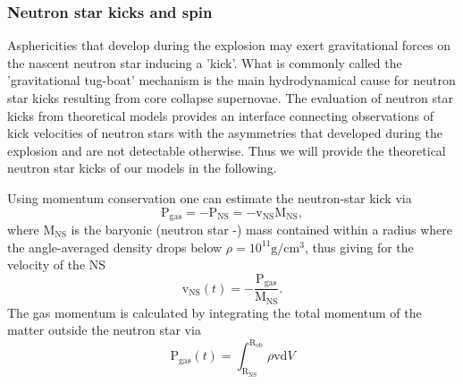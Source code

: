 \documentclass[fleqn,usenatbib]{mnras}
\newcommand{\ud}{\ensuremath{\mathrm{d}}}
\begin{document}
\subsubsection{Neutron star kicks and spin}
Asphericities that develop during the explosion may exert gravitational forces on the nascent neutron star inducing a 'kick'. What is commonly called the 'gravitational tug-boat' mechanism is the main hydrodynamical cause for neutron star kicks resulting from core collapse supernovae. The evaluation of neutron star kicks from theoretical models provides an interface connecting observations of kick velocities of neutron stars with the asymmetries that developed during the explosion and are not detectable otherwise. Thus we will provide the theoretical neutron star kicks of our models in the following.

Using momentum conservation one can estimate the neutron-star kick via
\begin{equation}
  \pmb{\mathrm{P}}_{\mathrm{gas}} = - \pmb{\mathrm{P}}_{\mathrm{NS}} = - \pmb{\mathrm{v}}_{\mathrm{NS}}\mathrm{M_{NS}},
\end{equation}
where $\mathrm{M_{NS}}$ is the baryonic (neutron star -) mass contained within a radius where the angle-averaged density drops below $\rho = 10^{11} \mathrm{g/cm^3}$, thus giving for the velocity of the NS
\begin{equation}
  \pmb{\mathrm{v}}_{\mathrm{NS}}(t) = - \frac{\pmb{\mathrm{P}}_{\mathrm{gas}}}{ \mathrm{M_{NS}}}.
  \label{equ:momentum_kick}
\end{equation}
The gas momentum is calculated by integrating the total momentum of the matter outside the neutron star via
\begin{equation}
    \label{equ:pz}
  \pmb{\mathrm{P}}_{\mathrm{gas}} (t) = \int_{\mathrm{R_{NS}}}^{\mathrm{R_{ob}}} \rho \pmb{\mathrm{v}} \ud V
\end{equation}
\end{document}
